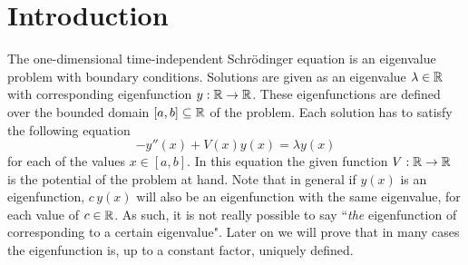 


\section{Introduction}

The one-dimensional time-independent Schrödinger equation is an eigenvalue problem with boundary conditions. Solutions are given as an eigenvalue $\lambda \in \mathbb{R}$ with corresponding eigenfunction $y: \mathbb{R} \to \mathbb{R}$. These eigenfunctions are defined over the bounded domain $[a, b] \subseteq \mathbb{R}$ of the problem. Each solution has to satisfy the following equation
$$
    -y''(x) + V(x)y(x) = \lambda y(x)
$$
for each of the values $x\in [a, b]$. In this equation the given function $V: \mathbb{R} \to \mathbb{R}$ is the potential of the problem at hand. Note that in general if $y(x)$ is an eigenfunction, $c\,y(x)$ will also be an eigenfunction with the same eigenvalue, for each value of $c \in \mathbb{R}$. As such, it is not really possible to say ``\emph{the} eigenfunction of corresponding to a certain eigenvalue". Later on we will prove that in many cases the eigenfunction is, up to a constant factor, uniquely defined.

